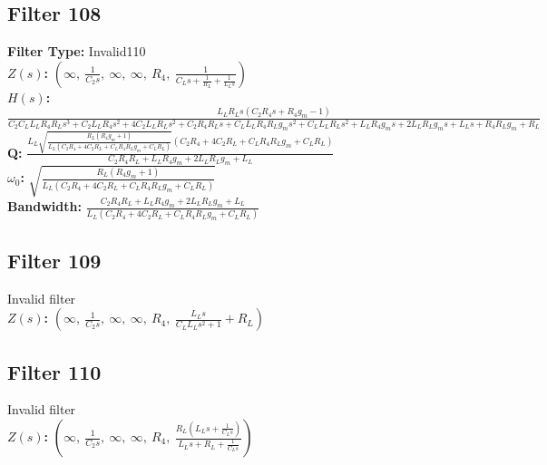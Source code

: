 \documentclass{article}
\begin{document}
\subsection*{Filter 108}
\textbf{Filter Type:} Invalid110 \\ 
\textbf{$Z(s)$:} $\left( \infty, \  \frac{1}{C_{2} s}, \  \infty, \  \infty, \  R_{4}, \  \frac{1}{C_{L} s + \frac{1}{R_{L}} + \frac{1}{L_{L} s}}\right)$ \\ 
\textbf{$H(s)$:} $\frac{L_{L} R_{L} s \left(C_{2} R_{4} s + R_{4} g_{m} - 1\right)}{C_{2} C_{L} L_{L} R_{4} R_{L} s^{3} + C_{2} L_{L} R_{4} s^{2} + 4 C_{2} L_{L} R_{L} s^{2} + C_{2} R_{4} R_{L} s + C_{L} L_{L} R_{4} R_{L} g_{m} s^{2} + C_{L} L_{L} R_{L} s^{2} + L_{L} R_{4} g_{m} s + 2 L_{L} R_{L} g_{m} s + L_{L} s + R_{4} R_{L} g_{m} + R_{L}}$ \\ 
\textbf{Q:} $\frac{L_{L} \sqrt{\frac{R_{L} \left(R_{4} g_{m} + 1\right)}{L_{L} \left(C_{2} R_{4} + 4 C_{2} R_{L} + C_{L} R_{4} R_{L} g_{m} + C_{L} R_{L}\right)}} \left(C_{2} R_{4} + 4 C_{2} R_{L} + C_{L} R_{4} R_{L} g_{m} + C_{L} R_{L}\right)}{C_{2} R_{4} R_{L} + L_{L} R_{4} g_{m} + 2 L_{L} R_{L} g_{m} + L_{L}}$ \\ 
\textbf{$\omega_0$:} $\sqrt{\frac{R_{L} \left(R_{4} g_{m} + 1\right)}{L_{L} \left(C_{2} R_{4} + 4 C_{2} R_{L} + C_{L} R_{4} R_{L} g_{m} + C_{L} R_{L}\right)}}$ \\ 
\textbf{Bandwidth:} $\frac{C_{2} R_{4} R_{L} + L_{L} R_{4} g_{m} + 2 L_{L} R_{L} g_{m} + L_{L}}{L_{L} \left(C_{2} R_{4} + 4 C_{2} R_{L} + C_{L} R_{4} R_{L} g_{m} + C_{L} R_{L}\right)}$ \\ 
\subsection*{Filter 109}
Invalid filter \\ 
\textbf{$Z(s)$:} $\left( \infty, \  \frac{1}{C_{2} s}, \  \infty, \  \infty, \  R_{4}, \  \frac{L_{L} s}{C_{L} L_{L} s^{2} + 1} + R_{L}\right)$ \\ 
\subsection*{Filter 110}
Invalid filter \\ 
\textbf{$Z(s)$:} $\left( \infty, \  \frac{1}{C_{2} s}, \  \infty, \  \infty, \  R_{4}, \  \frac{R_{L} \left(L_{L} s + \frac{1}{C_{L} s}\right)}{L_{L} s + R_{L} + \frac{1}{C_{L} s}}\right)$ \\ 
\end{document}
